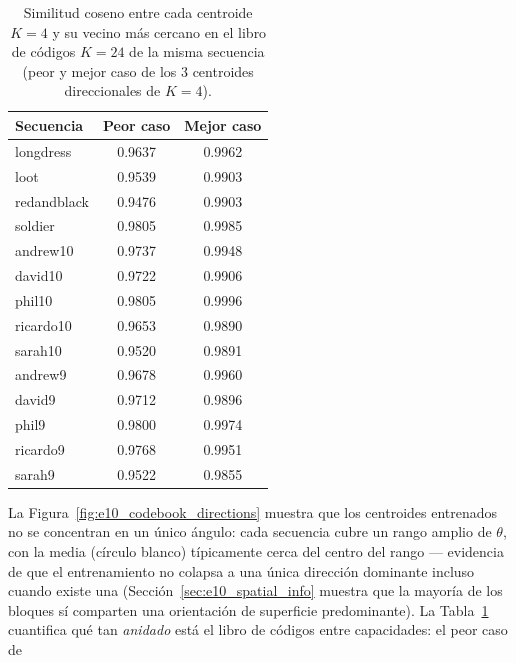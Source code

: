         \begin{table}[H]
            \centering
            \caption{Similitud coseno entre cada centroide $K=4$ y su vecino más cercano en el
            libro de códigos $K=24$ de la misma secuencia (peor y mejor caso de los 3 centroides
            direccionales de $K=4$).}
            \begin{tabular}{l|c|c}
                \hline
                \textbf{Secuencia} & \textbf{Peor caso} & \textbf{Mejor caso} \\
                \hline
                longdress    & 0.9637 & 0.9962 \\
                loot         & 0.9539 & 0.9903 \\
                redandblack  & 0.9476 & 0.9903 \\
                soldier      & 0.9805 & 0.9985 \\
                andrew10     & 0.9737 & 0.9948 \\
                david10      & 0.9722 & 0.9906 \\
                phil10       & 0.9805 & 0.9996 \\
                ricardo10    & 0.9653 & 0.9890 \\
                sarah10      & 0.9520 & 0.9891 \\
                andrew9      & 0.9678 & 0.9960 \\
                david9       & 0.9712 & 0.9896 \\
                phil9        & 0.9800 & 0.9974 \\
                ricardo9     & 0.9768 & 0.9951 \\
                sarah9       & 0.9522 & 0.9855 \\
                \hline
            \end{tabular}
            \label{tab:e10_codebook_nesting}
        \end{table}
        La Figura~\ref{fig:e10_codebook_directions} muestra que los centroides entrenados no se
        concentran en un único ángulo: cada secuencia cubre un rango amplio de $\theta$, con la
        media (círculo blanco) típicamente cerca del centro del rango — evidencia de que el
        entrenamiento no colapsa a una única dirección dominante incluso cuando existe una
        (Sección~\ref{sec:e10_spatial_info} muestra que la mayoría de los bloques sí comparten una
        orientación de superficie predominante). La Tabla~\ref{tab:e10_codebook_nesting} cuantifica
        qué tan \emph{anidado} está el libro de códigos entre capacidades: el peor caso de
